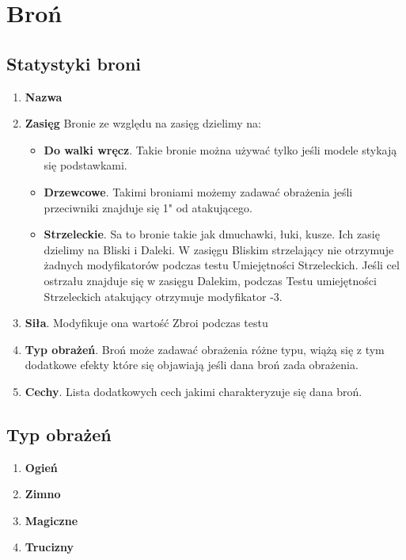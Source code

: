 \chapter{Broń}

\section{Statystyki broni}
\begin{enumerate}
    \item \textbf{Nazwa}
    \item \textbf{Zasięg}
    Bronie ze względu na zasięg dzielimy na:
    \begin{itemize}
        \item \textbf{Do walki wręcz}. Takie bronie można używać tylko jeśli modele stykają się podstawkami. 
        \item \textbf{Drzewcowe}. Takimi broniami możemy zadawać obrażenia jeśli przeciwniki znajduje się 1" od atakującego.   
        \item \textbf{Strzeleckie}. Sa to bronie takie jak dmuchawki, łuki, kusze. Ich zasię dzielimy na Bliski i Daleki. W zasięgu Bliskim strzelający nie otrzymuje żadnych modyfikatorów podczas testu Umiejętności Strzeleckich. Jeśli cel ostrzału znajduje się w zasięgu Dalekim, podczas Testu umiejętności Strzeleckich atakujący otrzymuje modyfikator -3. 
    \end{itemize}
    \item \textbf{Siła}. Modyfikuje ona wartość Zbroi podczas testu 
    \item \textbf{Typ obrażeń}. Broń może zadawać obrażenia różne typu, wiążą się z tym dodatkowe efekty które się objawiają jeśli dana broń zada obrażenia. 
    \item \textbf{Cechy}. Lista dodatkowych cech jakimi charakteryzuje się dana broń. 
\end{enumerate}


\section{Typ obrażeń}
\begin{enumerate}
    \item \textbf{Ogień}
    \item \textbf{Zimno}
    \item \textbf{Magiczne}
    \item \textbf{Trucizny}
\end{enumerate}

